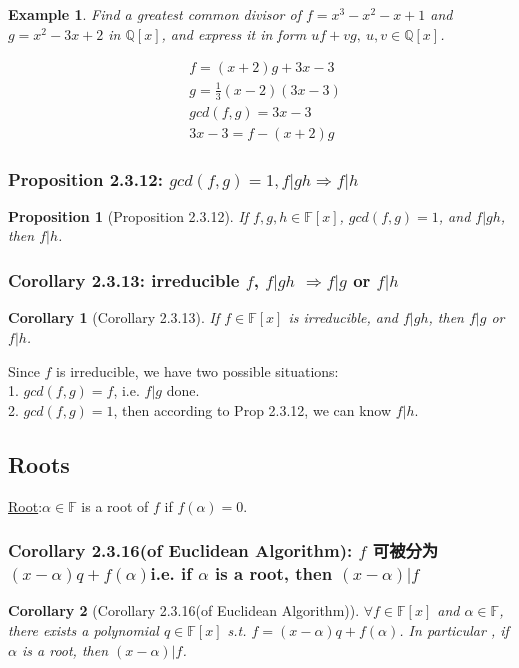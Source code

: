\documentclass[11pt,a4paper]{article}
\newtheorem{proposition}{Proposition}
\newtheorem{example}{Example}
\newtheorem{corollary}{Corollary}
\begin{document}
\begin{example}
    Find a greatest common divisor of $f=x^3-x^2-x+1$ and $g=x^2-3x+2$ in $\mathbb{Q}[x]$, and express it in form $uf+vg,\ u,v\in\mathbb{Q}[x]$.
\end{example}
\begin{equation}
    \begin{aligned}
        &f=(x+2)g+3x-3\\
        &g=\frac{1}{3}(x-2)(3x-3)\\
        &gcd(f,g)=3x-3\\
        &3x-3=f-(x+2)g
    \end{aligned}
    \nonumber
\end{equation}


\subsubsection{Proposition 2.3.12: $gcd(f,g)=1, f|gh\Rightarrow f|h$}
\begin{proposition}[Proposition 2.3.12]
If $f,g,h\in\mathbb{F}[x]$, $gcd(f,g)=1$, and $f|gh$, then $f|h$.
\end{proposition}

\subsubsection{Corollary 2.3.13: irreducible $f$, $f|gh$ $\Rightarrow f|g$ or $f|h$}
\begin{corollary}[Corollary 2.3.13]
If $f\in\mathbb{F}[x]$ is irreducible, and $f|gh$, then $f|g$ or $f|h$.
\end{corollary}
Since $f$ is irreducible, we have two possible situations:\\
1. $gcd(f,g)=f$, i.e. $f|g$ done.\\
2. $gcd(f,g)=1$, then according to Prop 2.3.12, we can know $f|h$.\\


\subsection{Roots}
\underline{Root}:$\alpha\in\mathbb{F}$ is a root of $f$ if $f(\alpha)=0$.

\subsubsection{Corollary 2.3.16(of Euclidean Algorithm): $f$ 可被分为 $(x-\alpha)q+f(\alpha)$i.e. if $\alpha$ is a root, then $(x-\alpha)|f$}
\begin{corollary}[Corollary 2.3.16(of Euclidean Algorithm)]
$\forall f\in\mathbb{F}[x]$ and $\alpha\in\mathbb{F}$, there exists a polynomial $q\in\mathbb{F}[x]$ s.t. $f=(x-\alpha)q+f(\alpha)$. In particular , if $\alpha$ is a root, then $(x-\alpha)|f$.
\end{corollary}
\end{document}
